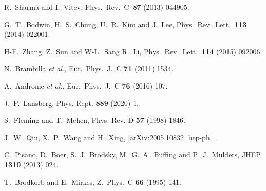 \documentclass[prd,aps,preprintnumbers,nofootinbib,superscriptaddress]{revtex4}
\begin{document}
\begin{thebibliography}{99}
R.~Sharma and I.~Vitev,
Phys.\ Rev.\ C\ {\bf87} (2013)  044905. 

  G.~T.~Bodwin, H.~S.~Chung, U.~R.~Kim and J.~Lee,
  Phys.\ Rev.\ Lett.\  {\bf 113}  (2014)  022001.

H-F.~Zhang, Z.~Sun and W-L.~Sang R.~Li,
Phys.\ Rev.\ Lett.\ {\bf114}  (2015)  092006.

  N.~Brambilla {\it et al.},
  Eur.\ Phys.\ J.\ C {\bf 71} (2011) 1534.

  A.~Andronic {\it et al.},
  Eur.\ Phys.\ J.\ C {\bf 76} (2016)  107.

J.~P.~Lansberg,
Phys. Rept. \textbf{889} (2020) 1.

S.~Fleming and T.~Mehen, Phys. Rev. D {\bf57} (1998) 1846.  

J.~W.~Qiu, X.~P.~Wang and H.~Xing,
[arXiv:2005.10832 [hep-ph]].

  C.~Pisano, D.~Boer, S.~J.~Brodsky, M.~G.~A.~Buffing and P.~J.~Mulders,
  JHEP {\bf 1310} (2013) 024.

  T.~Brodkorb and E.~Mirkes,
  Z.\ Phys.\ C {\bf 66}  (1995)  141.


\end{thebibliography}
\end{document}

